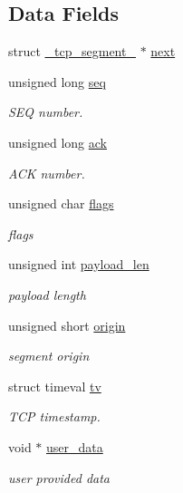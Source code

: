 \subsection*{Data Fields}
\begin{DoxyCompactItemize}
\item 
struct \hyperlink{struct__tcp__segment__}{\-\_\-tcp\-\_\-segment\-\_\-} $\ast$ \hyperlink{struct__tcp__segment___ae87e4b1042e85d16f28dbf276445d7e9}{next}
\item 
unsigned long \hyperlink{struct__tcp__segment___a189930c4babdc38135a74db479534069}{seq}
\begin{DoxyCompactList}\small\item\em S\-E\-Q number. \end{DoxyCompactList}\item 
unsigned long \hyperlink{struct__tcp__segment___af10658522b9bf1a01d186c69c70efc01}{ack}
\begin{DoxyCompactList}\small\item\em A\-C\-K number. \end{DoxyCompactList}\item 
unsigned char \hyperlink{struct__tcp__segment___a78ac89a4a0f57ffa7c2ecf31749aa390}{flags}
\begin{DoxyCompactList}\small\item\em flags \end{DoxyCompactList}\item 
unsigned int \hyperlink{struct__tcp__segment___a3d431f3cd732945366a2d6d553a69f5c}{payload\-\_\-len}
\begin{DoxyCompactList}\small\item\em payload length \end{DoxyCompactList}\item 
unsigned short \hyperlink{struct__tcp__segment___a2c09a48f3f12ff0e1ed8c7699f52a37d}{origin}
\begin{DoxyCompactList}\small\item\em segment origin \end{DoxyCompactList}\item 
struct timeval \hyperlink{struct__tcp__segment___a9cf96982557d56650f0f4cd3762f05a0}{tv}
\begin{DoxyCompactList}\small\item\em T\-C\-P timestamp. \end{DoxyCompactList}\item 
void $\ast$ \hyperlink{struct__tcp__segment___a0f53d287ac7c064d1a49d4bd93ca1cb9}{user\-\_\-data}
\begin{DoxyCompactList}\small\item\em user provided data \end{DoxyCompactList}\end{DoxyCompactItemize}


